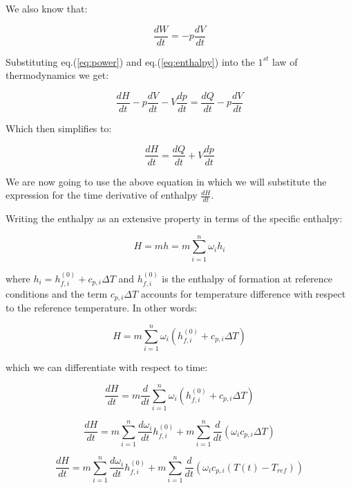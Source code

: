 \documentclass[10pt]{article}
\begin{document}
We also know that:

\begin{equation} \label{eq:power}
\frac{dW}{dt} = -p \frac{dV}{dt}
\end{equation}


Substituting eq.(\ref{eq:power}) and eq.(\ref{eq:enthalpy}) into the $1^{st}$ law of thermodynamics we get:

\begin{equation}
\frac{dH}{dt} - p \frac{dV}{dt} - V \frac{dp}{dt} = \frac{dQ}{dt} -p \frac{dV}{dt}
\end{equation}

Which then simplifies to:

\begin{equation} \label{eq:enthalpy-from-1st-law}
\frac{dH}{dt}  = \frac{dQ}{dt} + V \frac{dp}{dt}
\end{equation}

We are now going to use the above equation in which we will substitute the expression for the time derivative of enthalpy $\frac{dH}{dt}$.

Writing the enthalpy as an extensive property in terms of the specific enthalpy:

\begin{equation}
H = m h = m \sum_{i=1}^n \omega_i h_i
\end{equation}

where $h_i = h_{f,i}^{(0)} + c_{p,i} \Delta T$ and $h_{f,i}^{(0)}$ is the enthalpy of formation at reference conditions and the term $c_{p,i} \Delta T$ accounts for temperature difference with respect to the reference temperature. In other words:

\begin{equation}
H = m \sum_{i=1}^n \omega_i ( h_{f,i}^{(0)} + c_{p,i} \Delta T )
\end{equation}

which we can differentiate with respect to time:

\begin{equation*}
\frac{dH}{dt} = m \frac{d}{dt} \sum_{i=1}^n \omega_i ( h_{f,i}^{(0)} + c_{p,i} \Delta T )
\end{equation*}

\begin{equation*}
\frac{dH}{dt} = m \sum_{i=1}^n  \frac{d \omega_i}{dt}  h_{f,i}^{(0)}  + m \sum_{i=1}^n \frac{d}{dt} ( \omega_i c_{p,i} \Delta T )
\end{equation*}

\begin{equation*}
\frac{dH}{dt} = m \sum_{i=1}^n  \frac{d \omega_i}{dt}  h_{f,i}^{(0)}  + m \sum_{i=1}^n \frac{d}{dt} ( \omega_i c_{p,i} (T(t) - T_{ref}) )
\end{equation*}
\end{document}

